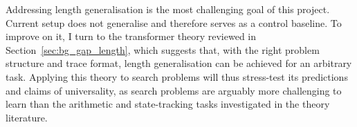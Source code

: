 %

Addressing length generalisation is the most challenging goal of this project.
Current setup does not generalise and therefore serves as a control baseline.
To improve on it, I turn to the transformer theory reviewed in Section~\ref{sec:bg_gap_length}, which suggests that, with the right problem structure and trace format, length generalisation can be achieved for an arbitrary task.
Applying this theory to search problems will thus stress-test its predictions and claims of universality, as search problems are arguably more challenging to learn than the arithmetic and state-tracking tasks investigated in the theory literature.

